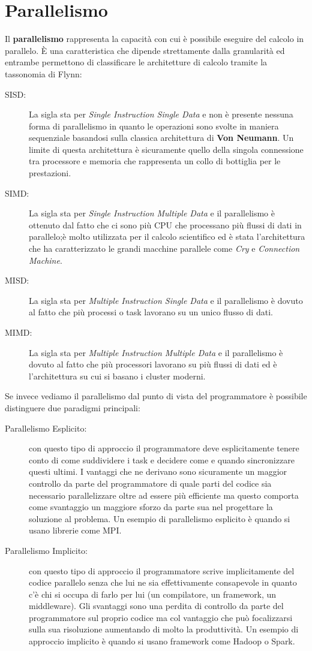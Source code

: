 \section{Parallelismo}
Il \textbf{parallelismo} rappresenta la capacità con cui è possibile eseguire del calcolo in parallelo. È una caratteristica che dipende strettamente dalla granularità ed entrambe permettono di classificare le architetture di calcolo tramite la tassonomia di Flynn:
\begin{description}
  \item[SISD:] La sigla sta per \textit{Single Instruction Single Data} e non è presente nessuna forma di parallelismo in quanto le operazioni sono svolte in maniera sequenziale basandosi sulla classica architettura di \textbf{Von Neumann}. Un limite di questa architettura è sicuramente quello della singola connessione tra processore e memoria che rappresenta un collo di bottiglia per le prestazioni.
  \item[SIMD:] La sigla sta per \textit{Single Instruction Multiple Data} e il parallelismo è ottenuto dal fatto che ci sono più CPU che processano più flussi di dati in parallelo;è molto utilizzata per il calcolo scientifico ed è stata l'architettura che ha caratterizzato le grandi macchine parallele come \textit{Cry} e \textit{Connection Machine}.
  \item[MISD:] La sigla sta per \textit{Multiple Instruction Single Data} e il parallelismo è dovuto al fatto che più processi o task lavorano su un unico flusso di dati.
  \item[MIMD:] La sigla sta per \textit{Multiple Instruction Multiple Data} e il parallelismo è dovuto al fatto che più processori lavorano su più flussi di dati ed è l'architettura su cui si basano i cluster moderni.
\end{description}
Se invece vediamo il parallelismo dal punto di vista del programmatore è possibile distinguere due paradigmi principali:
\begin{description}
  \item[Parallelismo Esplicito:]con questo tipo di approccio il programmatore deve esplicitamente tenere conto di come suddividere i task e decidere come e quando sincronizzare questi ultimi. I vantaggi che ne derivano sono sicuramente un maggior controllo da parte del programmatore di quale parti del codice sia necessario parallelizzare oltre ad essere più efficiente ma questo comporta come svantaggio un maggiore sforzo da parte sua nel progettare la soluzione al problema. Un esempio di parallelismo esplicito è quando si usano librerie come MPI.
  \item[Parallelismo Implicito:] con questo tipo di approccio il programmatore scrive implicitamente del codice parallelo senza che lui ne sia effettivamente consapevole in quanto c'è chi si occupa di farlo per lui (un compilatore, un framework, un middleware). Gli svantaggi sono una perdita di controllo da parte del programmatore sul proprio codice ma col vantaggio che può focalizzarsi sulla sua risoluzione aumentando di molto la produttività. Un esempio di approccio implicito è quando si usano framework come Hadoop o Spark.
\end{description}
